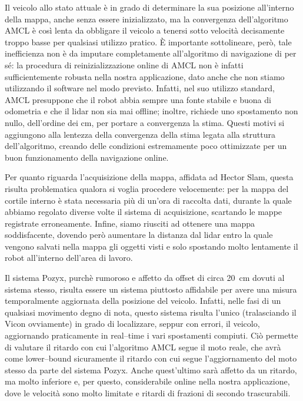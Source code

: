 \vspace{0.5cm}
Il veicolo allo stato attuale \`e in grado di determinare la sua posizione all’interno della mappa, anche senza essere inizializzato, ma la convergenza dell'algoritmo AMCL \`e cos\`i lenta da obbligare il veicolo a tenersi sotto velocit\`a decisamente troppo basse per qualsiasi utilizzo pratico. 
\`E importante sottolineare, per\`o, tale inefficienza non è da imputare completamente all'algoritmo di navigazione di per sé: la procedura di reinizializzazione online di AMCL non \`e infatti sufficientemente robusta nella nostra applicazione, dato anche che non stiamo utilizzando il software nel modo previsto.
Infatti, nel suo utilizzo standard, AMCL presuppone che il robot abbia sempre una fonte stabile e buona di odometria e che il lidar non sia mai offline; inoltre, richiede uno spostamento non nullo, dell’ordine dei cm, per portare a convergenza la stima. Questi motivi si aggiungono alla lentezza della convergenza della stima legata alla struttura dell'algoritmo, creando delle condizioni estremamente poco ottimizzate per un buon funzionamento della navigazione online.

\vspace{0.5cm}
Per quanto riguarda l'acquisizione della mappa, affidata ad Hector Slam, questa risulta problematica qualora si voglia procedere velocemente: per la mappa del cortile interno \`e stata necessaria pi\`u di un'ora di raccolta dati, durante la quale abbiamo regolato diverse volte il sistema di acquisizione, scartando le mappe registrate erroneamente. Infine, siamo riusciti ad ottenere una mappa soddisfacente, dovendo però aumentare la distanza dal lidar entro la quale vengono salvati nella mappa gli oggetti visti e solo spostando molto lentamente il robot all'interno dell'area di lavoro.

\vspace{0.5cm}
Il sistema Pozyx, purch\`e rumoroso e affetto da offset di circa \SI{20}{\centi \meter} dovuti al sistema stesso, risulta essere un sistema piuttosto affidabile per avere una misura temporalmente aggiornata della posizione del veicolo.
Infatti, nelle fasi di un qualsiasi movimento degno di nota, questo sistema risulta l'unico (tralasciando il Vicon ovviamente) in grado di localizzare, seppur con errori, il veicolo, aggiornando praticamente in real--time i vari spostamenti compiuti. 
Ciò permette di valutare il ritardo con cui l'algoritmo AMCL segue il moto reale, che avrà come lower--bound sicuramente il ritardo con cui segue l'aggiornamento del moto stesso da parte del sistema Pozyx. 
Anche quest'ultimo sarà affetto da un ritardo, ma molto inferiore e, per questo, considerabile online nella nostra applicazione, dove le velocità sono molto limitate e ritardi di frazioni di secondo trascurabili. 

